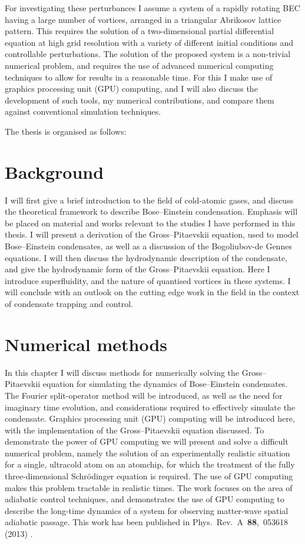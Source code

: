 For investigating these perturbances I assume a system of a rapidly rotating BEC having a large number of vortices, arranged in a triangular Abrikosov lattice pattern. This requires the solution of a two-dimensional partial differential equation at high grid resolution with a variety of different initial conditions and controllable perturbations. The solution of the proposed system is a non-trivial numerical problem, and requires the use of advanced numerical computing techniques to allow for results in a reasonable time. For this I make use of graphics processing unit (GPU) computing, and I will also discuss the development of such tools, my numerical contributions, and compare them against conventional simulation techniques.

The thesis is organised as follows:

\section*{Background}
I will first give a brief introduction to the field of cold-atomic gases, and discuss the theoretical framework to describe Bose--Einstein condensation. Emphasis will be placed on material and works relevant to the studies I have performed in this thesis. I will present a derivation of the Gross--Pitaevskii equation, used to model Bose--Einstein condensates, as well as a discussion of the Bogoliubov-de Gennes equations. I will then discuss the hydrodynamic description of the condensate, and give the hydrodynamic form of the Gross--Pitaevskii equation. Here I introduce superfluidity, and the nature of quantised vortices in these systems. I will conclude with an outlook on the cutting edge work in the field in the context of condensate trapping and control.


\section*{Numerical methods}
In this chapter I will discuss methods for numerically solving the Gross--Pitaevskii equation for simulating the dynamics of Bose--Einstein condensates. The Fourier split-operator method will be introduced, as well as the need for imaginary time evolution, and considerations required to effectively simulate the condensate. Graphics processing unit (GPU) computing will be introduced here, with the implementation of the Gross--Pitaevskii equation discussed. To demonstrate the power of GPU computing we will present and solve a difficult numerical problem, namely the solution of an experimentally realistic situation for a single, ultracold atom on an atomchip, for which the treatment of the fully three-dimensional Schr\"odinger equation is required. The use of GPU computing makes this problem tractable in realistic times. The work focuses on the area of adiabatic control techniques, and demonstrates the use of GPU computing to describe the long-time dynamics of a system for observing matter-wave spatial adiabatic passage. This work has been published in  Phys.~Rev.~A~\textbf{88},~053618 (2013) \cite{AO:Morgan_pra_2013}.

